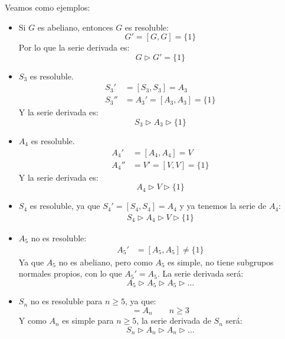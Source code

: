 \begin{ejemplo}
    Veamos como ejemplos:
    \begin{itemize}
        \item Si $G$ es abeliano, entonces $G$ es resoluble:
            \begin{equation*}
                G' = [G, G] = \{1\}
            \end{equation*}
            Por lo que la serie derivada es:
            \begin{equation*}
                G \rhd G' = \{1\}
            \end{equation*}
        \item $S_3$ es resoluble.
            \begin{align*}
                S_3' &= [S_3,S_3] = A_3 \\
                S_3'' &= A_3' = [A_3, A_3] = \{1\}
            \end{align*}
            Y la serie derivada es:
            \begin{equation*}
                S_3 \rhd A_3 \rhd \{1\}
            \end{equation*}
        \item $A_4$ es resoluble.
            \begin{align*}
                A_4' &= [A_4, A_4] = V \\
                A_4'' &= V' = [V, V] = \{1\}
            \end{align*}
            Y la serie derivada es:
            \begin{equation*}
                A_4 \rhd V \rhd \{1\}
            \end{equation*}
        \item $S_4$ es resoluble, ya que $S_4' = [S_4, S_4] = A_4$ y ya tenemos la serie de $A_4$:
            \begin{align*}
                S_4 \rhd A_4 \rhd V \rhd \{1\}
            \end{align*}
        \item $A_5$ no es resoluble:
            \begin{align*}
                A_5' &= [A_5, A_5] \neq \{1\}
            \end{align*}
            Ya que $A_5$ no es abeliano, pero como $A_5$ es simple, no tiene subgrupos normales propios, con lo que $A_5' = A_5$. La serie derivada será:
            \begin{equation*}
                A_5 \rhd A_5 \rhd A_5 \rhd \ldots
            \end{equation*}
        \item $S_n$ no es resoluble para $n\geq 5$, ya que:
            \begin{equation*}
                [S_n, S_n] = A_n  \qquad n\geq 3
            \end{equation*}
            Y como $A_n$ es simple para $n\geq 5$, la serie derivada de $S_n$ será:
            \begin{equation*}
                S_n \rhd A_n \rhd A_n \rhd \ldots
            \end{equation*}
    \end{itemize}
\end{ejemplo}

